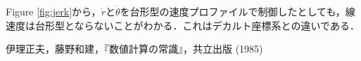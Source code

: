 \documentclass[twocolumn,oneside,a4paper]{article}
\begin{document}
Figure \ref{fig:jerk}から，$\dot{r}$と$\dot{\theta}$を台形型の速度プロファイルで制御したとしても，線速度は台形型とならないことがわかる．これはデカルト座標系との違いである．


\begin{thebibliography}{99}
   伊理正夫，藤野和建，『数値計算の常識』，共立出版 (1985)
\end{thebibliography}

\end{document}
